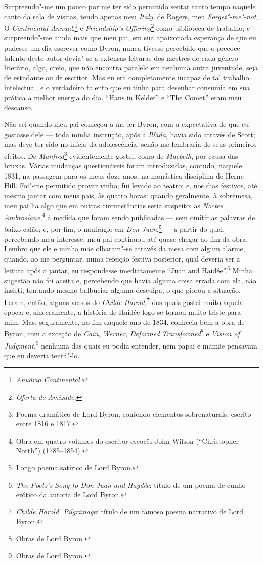 Surpreendo"-me um pouco por me ter sido permitido sentar tanto tempo
naquele canto da sala de visitas, tendo apenas meu \textit{Italy}, de
Rogers, meu \textit{Forget"-me"-not}, O \textit{Continental Annual},\footnote{\textit{Anuário
  Continental.}} e \textit{Friendship's
Offering}\footnote{\textit{Oferta de Amizade.}} como
biblioteca de trabalho; e surpreendo"-me ainda mais que meu pai, em sua
apaixonada esperança de que eu pudesse um dia escrever como Byron, nunca
tivesse percebido que o precoce talento deste autor devia"-se a extensas
leituras dos mestres de cada gênero literário, algo, creio, que não
encontra paralelo em nenhuma outra juventude, seja de estudante ou de
escritor. Mas eu era completamente incapaz de tal trabalho intelectual,
e o verdadeiro talento que eu tinha para desenhar consumia em sua
prática a melhor energia do dia. ``Hans in Kelder'' e ``The Comet'' eram
meu descanso.

Não sei quando meu pai começou a me ler Byron, com a expectativa de que
eu gostasse dele --- toda minha instrução, após a \textit{Ilíada}, havia
sido através de Scott; mas deve ter sido no início da adolescência,
senão me lembraria de seus primeiros efeitos. De
\textit{Manfred}\footnote{Poema dramático de Lord Byron, contendo
  elementos sobrenaturais, escrito entre 1816 e 1817.}
evidentemente gostei, como de \textit{Macbeth}, por causa das bruxas.
Várias mudanças questionáveis foram introduzidas, contudo, naquele 1831,
na passagem para os meus doze anos, na monástica disciplina de Herne
Hill. Foi"-me permitido provar vinho; fui levado ao teatro; e, nos dias
festivos, até mesmo jantar com meus pais, às quatro horas: quando
geralmente, à sobremesa, meu pai lia algo que em outras circunstâncias
seria suspeito: as \textit{Noctes} \textit{Ambrosiane},\footnote{Obra em
  quatro volumes do escritor escocês John Wilson (``Christopher North'')
  (1785--1854).} à medida que foram sendo publicadas ---
sem omitir as palavras de baixo calão; e, por fim, o naufrágio em
\textit{Don Juan},\footnote{Longo poema satírico de Lord Byron.} --- \textit{a} partir do qual, percebendo meu interesse,
meu pai continuou até quase chegar ao fim da obra. Lembro que ele e
minha mãe olharam"-se através da mesa com algum alarme, quando, ao me
perguntar, numa refeição festiva posterior, qual deveria ser a leitura
após o jantar, eu respondesse imediatamente ``Juan and Haidée''.\footnote{\textit{The
  Poets's Song to Don Juan and Haydée}: título de um poema de cunho
  erótico da autoria de Lord Byron.} Minha sugestão
não foi aceita e, percebendo que havia alguma coisa errada com ela, não
insisti, tentando mesmo balbuciar alguma desculpa, o que piorou a
situação. Leram, então, alguns versos do \textit{Childe Harold},\footnote{\textit{Childe
  Harold' Pilgrimage}: título de um famoso poema narrativo de Lord Byron.} dos quais gostei muito àquela época; e,
sinceramente, a história de Haidée logo se tornou muito triste para mim.
Mas, seguramente, no fim daquele ano de 1834, conhecia bem a obra de
Byron, com a exceção de \textit{Cain}, \textit{Werner}, \textit{Deformed}
\textit{Transformed}\footnote{Obras de Lord Byron.} e
\textit{Vision of Judgment},\footnote{Obras de Lord Byron.}
nenhuma das quais eu podia entender, nem papai e mamãe pensavam que eu
deveria tentá"-lo.

